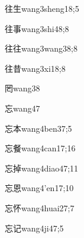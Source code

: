\begin{verbete}{往生}{wang3sheng1}{8;5}
\end{verbete}

\begin{verbete}{往事}{wang3shi4}{8;8}
\end{verbete}

\begin{verbete}{往往}{wang3wang3}{8;8}
\end{verbete}

\begin{verbete}{往昔}{wang3xi1}{8;8}
\end{verbete}

\begin{verbete}{罔}{wang3}{8}
\end{verbete}

\begin{verbete}{忘}{wang4}{7}
\end{verbete}

\begin{verbete}{忘本}{wang4ben3}{7;5}
\end{verbete}

\begin{verbete}{忘餐}{wang4can1}{7;16}
\end{verbete}

\begin{verbete}{忘掉}{wang4diao4}{7;11}
\end{verbete}

\begin{verbete}{忘恩}{wang4'en1}{7;10}
\end{verbete}

\begin{verbete}{忘怀}{wang4huai2}{7;7}
\end{verbete}

\begin{verbete}{忘记}{wang4ji4}{7;5}
\end{verbete}


